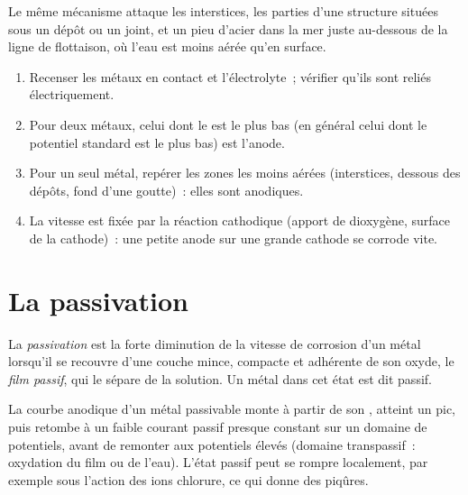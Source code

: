 Le même mécanisme attaque les interstices, les parties d'une structure situées sous un dépôt
ou un joint, et un pieu d'acier dans la mer juste au-dessous de la ligne de flottaison, où
l'eau est moins aérée qu'en surface.

\begin{method}\label{met:b2:corrosion:diagnose}
\begin{enumerate}
  \item Recenser les métaux en contact et l'électrolyte~; vérifier qu'ils sont
        reliés électriquement.
  \item Pour deux métaux, celui dont le  est le plus bas (en général
        celui dont le potentiel standard est le plus bas) est l'anode.
  \item Pour un seul métal, repérer les zones les moins aérées (interstices, dessous des dépôts,
        fond d'une goutte)~: elles sont anodiques.
  \item La vitesse est fixée par la réaction cathodique (apport de dioxygène, surface de la cathode)~:
        une petite anode sur une grande cathode se corrode vite.
\end{enumerate}
\end{method}

\section{La passivation}

\begin{definition}[Passivation]\label{def:b2:corrosion:passivation}
La \emph{passivation} est la forte diminution de la vitesse de
corrosion d'un métal lorsqu'il se recouvre d'une couche mince, compacte et adhérente de son
oxyde, le \emph{film passif}, qui le sépare de la
solution. Un métal dans cet état est dit passif.
\end{definition}

\begin{proposition}\label{prop:b2:corrosion:passivity}
La courbe anodique d'un métal passivable monte à partir de son ,
atteint un pic, puis retombe à un faible courant passif presque constant sur un
domaine de potentiels, avant de remonter aux potentiels élevés (domaine
transpassif~: oxydation du film ou de l'eau). L'état passif peut se rompre
localement, par exemple sous l'action des ions chlorure, ce qui donne des piqûres.
\end{proposition}

